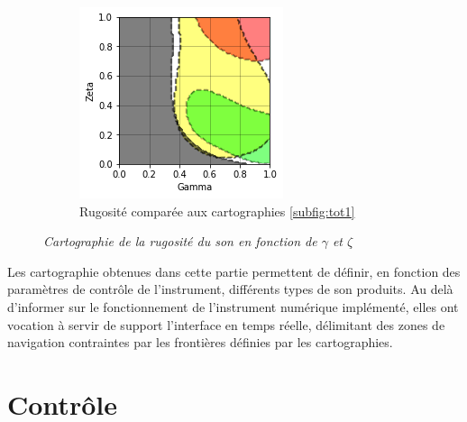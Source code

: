 \documentclass[french, twocolumn]{article}
\begin{document}
\begin{figure}[h!]
\begin{subfigure}[b]{.49\linewidth}
        \includegraphics[width=\linewidth]{img/carto_tot.png}
        \caption{Rugosité comparée aux cartographies \ref{subfig:tot1}}
        \label{fig:rugo_cartoto}
    \end{subfigure}
    
    \caption{\emph{Cartographie de la rugosité du son en fonction de $\gamma$ et $\zeta$}}
    \label{fig:cartographies}
\end{figure}

Les cartographie obtenues dans cette partie permettent de définir, en fonction des paramètres de contrôle de l'instrument, différents types de son produits. Au delà d'informer sur le fonctionnement de l'instrument numérique implémenté, elles ont vocation à servir de support l'interface en temps réelle, délimitant des zones de navigation contraintes par les frontières définies par les cartographies. 


\section{Contrôle}





\end{document}

